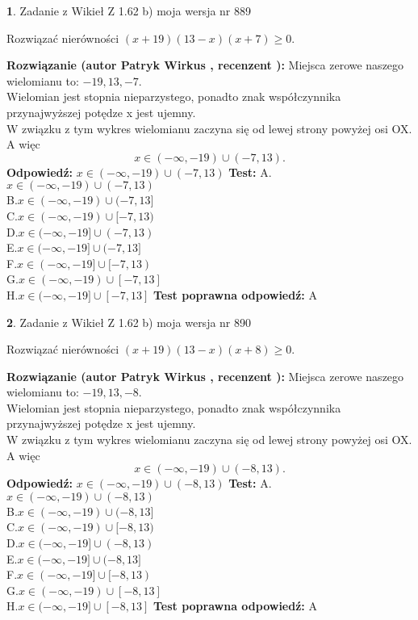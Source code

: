 \documentclass[12pt, a4paper]{article}
\theoremstyle{definition} %
\newtheorem{zad}{}
\newcommand{\zadStart}[1]{\begin{zad}#1\newline}
\newcommand{\zadStop}{\end{zad}}
\newcommand{\rozwStart}[2]{\noindent \textbf{Rozwiązanie (autor #1 , recenzent #2): }\newline}
\newcommand{\rozwStop}{\newline}
\newcommand{\odpStart}{\noindent \textbf{Odpowiedź:}\newline}
\newcommand{\odpStop}{\newline}
\newcommand{\testStart}{\noindent \textbf{Test:}\newline}
\newcommand{\testStop}{\newline}
\newcommand{\kluczStart}{\noindent \textbf{Test poprawna odpowiedź:}\newline}
\newcommand{\kluczStop}{\newline}
\begin{document}
\zadStart{Zadanie z Wikieł Z 1.62 b) moja wersja nr 889}

Rozwiązać nierówności $(x+19)(13-x)(x+7)\ge0$.
\zadStop
\rozwStart{Patryk Wirkus}{}
Miejsca zerowe naszego wielomianu to: $-19, 13, -7$.\\
Wielomian jest stopnia nieparzystego, ponadto znak współczynnika przy\linebreak najwyższej potędze x jest ujemny.\\ W związku z tym wykres wielomianu zaczyna się od lewej strony powyżej osi OX. A więc $$x \in (-\infty,-19) \cup (-7,13).$$
\rozwStop
\odpStart
$x \in (-\infty,-19) \cup (-7,13)$
\odpStop
\testStart
A.$x \in (-\infty,-19) \cup (-7,13)$\\
B.$x \in (-\infty,-19) \cup (-7,13]$\\
C.$x \in (-\infty,-19) \cup [-7,13)$\\
D.$x \in (-\infty,-19] \cup (-7,13)$\\
E.$x \in (-\infty,-19] \cup (-7,13]$\\
F.$x \in (-\infty,-19] \cup [-7,13)$\\
G.$x \in (-\infty,-19) \cup [-7,13]$\\
H.$x \in (-\infty,-19] \cup [-7,13]$
\testStop
\kluczStart
A
\kluczStop



\zadStart{Zadanie z Wikieł Z 1.62 b) moja wersja nr 890}

Rozwiązać nierówności $(x+19)(13-x)(x+8)\ge0$.
\zadStop
\rozwStart{Patryk Wirkus}{}
Miejsca zerowe naszego wielomianu to: $-19, 13, -8$.\\
Wielomian jest stopnia nieparzystego, ponadto znak współczynnika przy\linebreak najwyższej potędze x jest ujemny.\\ W związku z tym wykres wielomianu zaczyna się od lewej strony powyżej osi OX. A więc $$x \in (-\infty,-19) \cup (-8,13).$$
\rozwStop
\odpStart
$x \in (-\infty,-19) \cup (-8,13)$
\odpStop
\testStart
A.$x \in (-\infty,-19) \cup (-8,13)$\\
B.$x \in (-\infty,-19) \cup (-8,13]$\\
C.$x \in (-\infty,-19) \cup [-8,13)$\\
D.$x \in (-\infty,-19] \cup (-8,13)$\\
E.$x \in (-\infty,-19] \cup (-8,13]$\\
F.$x \in (-\infty,-19] \cup [-8,13)$\\
G.$x \in (-\infty,-19) \cup [-8,13]$\\
H.$x \in (-\infty,-19] \cup [-8,13]$
\testStop
\kluczStart
A
\kluczStop
\end{document}
